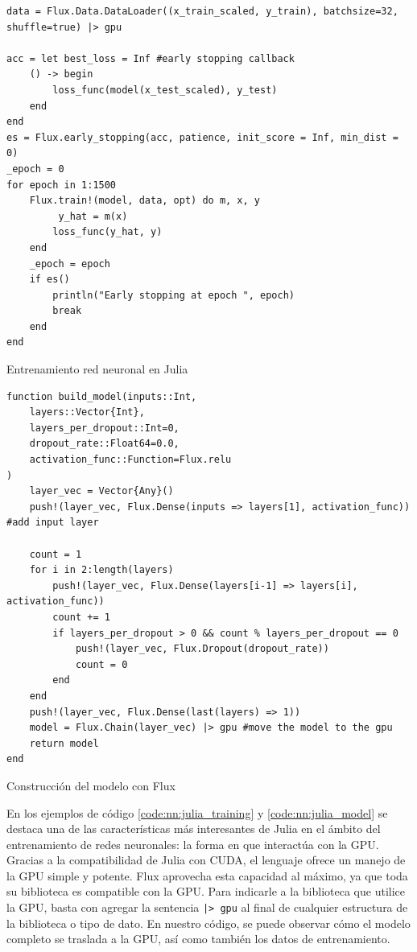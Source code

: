 \documentclass[11pt]{article}
\begin{document}
\begin{listing}[h]
\begin{verbatim}
data = Flux.Data.DataLoader((x_train_scaled, y_train), batchsize=32, shuffle=true) |> gpu
    
acc = let best_loss = Inf #early stopping callback
    () -> begin
        loss_func(model(x_test_scaled), y_test)
    end 
end
es = Flux.early_stopping(acc, patience, init_score = Inf, min_dist = 0)
_epoch = 0
for epoch in 1:1500
    Flux.train!(model, data, opt) do m, x, y
         y_hat = m(x)
        loss_func(y_hat, y)
    end
    _epoch = epoch
    if es()
        println("Early stopping at epoch ", epoch)
        break
    end
end
\end{verbatim}
\caption{Entrenamiento red neuronal en Julia}
\label{code:nn:julia_training}
\end{listing}

\begin{listing}[h]
\begin{verbatim}
function build_model(inputs::Int,
    layers::Vector{Int},
    layers_per_dropout::Int=0,
    dropout_rate::Float64=0.0,
    activation_func::Function=Flux.relu
)
    layer_vec = Vector{Any}()
    push!(layer_vec, Flux.Dense(inputs => layers[1], activation_func)) #add input layer

    count = 1
    for i in 2:length(layers)
        push!(layer_vec, Flux.Dense(layers[i-1] => layers[i], activation_func))
        count += 1
        if layers_per_dropout > 0 && count % layers_per_dropout == 0
            push!(layer_vec, Flux.Dropout(dropout_rate))
            count = 0
        end
    end
    push!(layer_vec, Flux.Dense(last(layers) => 1))
    model = Flux.Chain(layer_vec) |> gpu #move the model to the gpu
    return model
end
\end{verbatim}
\caption{Construcción del modelo con Flux}
\label{code:nn:julia_model}
\end{listing}

En los ejemplos de código \ref{code:nn:julia_training} y \ref{code:nn:julia_model} se destaca una de las características más interesantes de Julia en el ámbito del entrenamiento de redes neuronales: la forma en que interactúa con la GPU. Gracias a la compatibilidad de Julia con CUDA, el lenguaje ofrece un manejo de la GPU simple y potente. Flux aprovecha esta capacidad al máximo, ya que toda su biblioteca es compatible con la GPU. Para indicarle a la biblioteca que utilice la GPU, basta con agregar la sentencia \lstinline{|> gpu} al final de cualquier estructura de la biblioteca o tipo de dato. En nuestro código, se puede observar cómo el modelo completo se traslada a la GPU, así como también los datos de entrenamiento.
\end{document}
